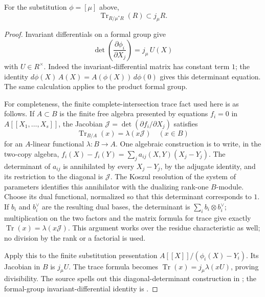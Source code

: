 \begin{srlemma}
\label{lem:ftb-jacobian-trace}
For the substitution \(\phi=[\mu]\) above,
\[
                 \operatorname{Tr}_{R/\mu^*R}(R)\subset j_\mu R .
\]
\end{srlemma}
\begin{proof}
Invariant differentials on a formal group give
\[
 \det\left(\frac{\partial\phi_i}{\partial X_j}\right)
                                      =j_\mu\,U(X)
\]
with \(U\in R^\times\).
Indeed the invariant-differential matrix has constant term \(1\);
the identity
\(d\phi(X)\,A(X)=A(\phi(X))\,d\phi(0)\)
gives this determinant equation.  The same calculation applies to
the product formal group.

For completeness, the finite complete-intersection trace fact used
here is as follows.  If \(A\subset B\) is the finite free algebra
presented by equations \(f_i=0\) in \(A[[X_1,\ldots,X_s]]\), the
Jacobian \(\mathcal J=\det(\partial f_i/\partial X_j)\) satisfies
\[
             \operatorname{Tr}_{B/A}(x)=\lambda(x\mathcal J)
                  \quad(x\in B)
\]
for an \(A\)-linear functional \(\lambda:B\to A\).
One algebraic construction is to write, in the two-copy algebra,
\(f_i(X)-f_i(Y)=\sum_j a_{ij}(X,Y)(X_j-Y_j)\).
The determinant of \(a_{ij}\) is annihilated by every
\(X_j-Y_j\), by the adjugate identity, and its restriction to the
diagonal is \(\mathcal J\).
The Koszul resolution of the system of parameters identifies this
annihilator with the dualizing rank-one \(B\)-module.
Choose its dual functional, normalized so that this determinant
corresponds to \(1\).
If \(b_i\) and \(b_i^\vee\) are the resulting dual bases, the
determinant is \(\sum_i b_i\otimes b_i^\vee\); multiplication on the
two factors and the matrix formula for trace give exactly
\(\operatorname{Tr}(x)=\lambda(x\mathcal J)\).
This argument works over the residue characteristic as well; no
division by the rank or a factorial is used.

Apply this to the finite substitution presentation
\(A[[X]]/(\phi_i(X)-Y_i)\).
Its Jacobian in \(B\) is \(j_\mu U\).
The trace formula becomes
\(\operatorname{Tr}(x)=j_\mu\lambda(xU)\), proving divisibility.
The source spells out this diagonal-determinant construction in
; the
formal-group invariant-differential identity is
.
\end{proof}

